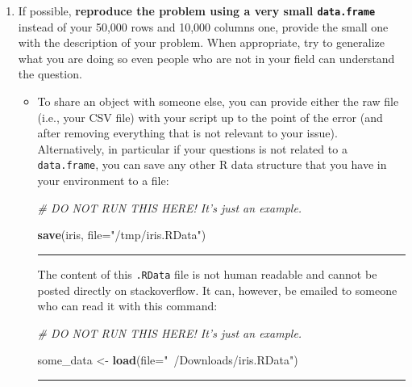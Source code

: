\documentclass[
]{article}
\newenvironment{Shaded}{\begin{snugshade}}{\end{snugshade}}
\newcommand{\CommentTok}[1]{\textcolor[rgb]{0.56,0.35,0.01}{\textit{#1}}}
\newcommand{\DataTypeTok}[1]{\textcolor[rgb]{0.13,0.29,0.53}{#1}}
\newcommand{\KeywordTok}[1]{\textcolor[rgb]{0.13,0.29,0.53}{\textbf{#1}}}
\newcommand{\NormalTok}[1]{#1}
\newcommand{\StringTok}[1]{\textcolor[rgb]{0.31,0.60,0.02}{#1}}
\providecommand{\tightlist}{%
  \setlength{\itemsep}{0pt}\setlength{\parskip}{0pt}}
\begin{document}
\begin{enumerate}
\def\labelenumi{\arabic{enumi}.}
\setcounter{enumi}{2}
\tightlist
\item
  If possible, \textbf{reproduce the problem using a very small
  \texttt{data.frame}} instead of your 50,000 rows and 10,000 columns
  one, provide the small one with the description of your problem. When
  appropriate, try to generalize what you are doing so even people who
  are not in your field can understand the question.

  \begin{itemize}
  \item
    To share an object with someone else, you can provide either the raw
    file (i.e., your CSV file) with your script up to the point of the
    error (and after removing everything that is not relevant to your
    issue). Alternatively, in particular if your questions is not
    related to a \texttt{data.frame}, you can save any other R data
    structure that you have in your environment to a file:

\begin{Shaded}
\begin{Highlighting}[]
\CommentTok{# DO NOT RUN THIS HERE! It's just an example.}

\KeywordTok{save}\NormalTok{(iris, }\DataTypeTok{file=}\StringTok{"/tmp/iris.RData"}\NormalTok{)}
\end{Highlighting}
\end{Shaded}

    \begin{center}\rule{0.5\linewidth}{\linethickness}\end{center}

    The content of this \texttt{.RData} file is not human readable and
    cannot be posted directly on stackoverflow. It can, however, be
    emailed to someone who can read it with this command:

\begin{Shaded}
\begin{Highlighting}[]
\CommentTok{# DO NOT RUN THIS HERE! It's just an example.}

\NormalTok{some_data <-}\StringTok{ }\KeywordTok{load}\NormalTok{(}\DataTypeTok{file=}\StringTok{"~/Downloads/iris.RData"}\NormalTok{)}
\end{Highlighting}
\end{Shaded}

    \begin{center}\rule{0.5\linewidth}{\linethickness}\end{center}
  \end{itemize}
\end{enumerate}
\end{document}
